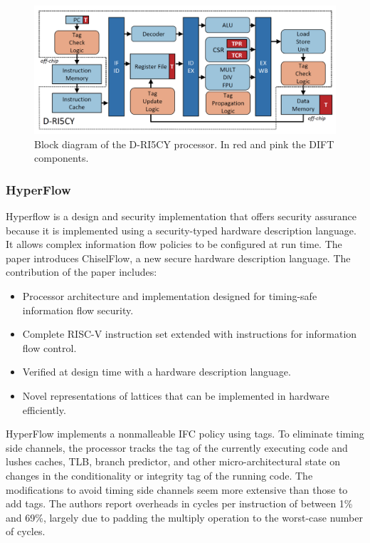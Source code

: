 \begin{figure}[htbp!] 
  \centering    
  \includegraphics[width=0.6  \textwidth]{D-RISCV}
  \caption[D-RISCY]{ Block diagram of the D-RI5CY processor. In red and pink the DIFT components. \cite{D-RISCY}}
  \label{fig:MTE}
  \end{figure}



\subsubsection{HyperFlow} 
Hyperflow\cite{HyperFlow} is a design and security implementation that offers security assurance because it is implemented 
using a security-typed hardware description language. It allows complex information flow policies to 
be configured at run time. The paper introduces ChiselFlow, a new secure hardware description language. 
The contribution of the paper includes: 
\begin{itemize}
  \item Processor architecture and implementation designed for timing-safe information flow security. 
  \item Complete RISC-V instruction set extended with instructions for information flow control. 
  \item Verified at design time with a hardware description language. 
  \item Novel representations of lattices that can be implemented in hardware efficiently. 
\end{itemize}
HyperFlow implements a nonmalleable IFC policy using tags.
To eliminate timing side channels, the processor tracks the tag of the currently executing code and lushes caches,
TLB, branch predictor, and other micro-architectural state on changes in the conditionality or integrity tag of the
running code. The modifications to avoid timing side channels seem more extensive than those to add tags. The
authors report overheads in cycles per instruction of between 1\% and 69\%, largely due to padding the multiply
operation to the worst-case number of cycles.


